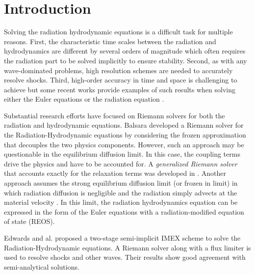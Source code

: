 \documentclass[review]{elsarticle}
\begin{document}
\section{Introduction}
\label{sec:section1}

Solving the radiation hydrodynamic equations is a difficult task for multiple reasons. First, the characteristic time scales between the radiation and hydrodynamics are different by several orders of magnitude which often requires the radiation part to be solved implicitly to ensure stability. Second, as with any wave-dominated problems, high resolution schemes are needed to accurately resolve shocks. Third, high-order accuracy in time and space is challenging to achieve but some recent works provide examples of such results when solving either the Euler equations \cite{Hussaini, jlg1, jlg2, Leveque} or the radiation equation \cite{nse_ragusa_wang,jcp_ragusa_wang}. 

Substantial research efforts have focused on Riemann solvers for both the radiation and hydrodynamic equations. Balsara \cite{Balsara} developed a Riemann solver for the Radiation-Hydrodynamic equations by considering the frozen approximation that decouples the two physics components. However, such an approach may be questionable in the equilibrium diffusion limit. In this case, the coupling terms drive the physics and have to be accounted for. A \emph{generalized Riemann solver} that accounts exactly for the relaxation terms was developed in \cite{LowrieMorelHittinger}. Another approach assumes the strong equilibrium diffusion limit (or frozen in limit) in which radiation diffusion is negligible and the radiation simply advects at the material velocity \cite{Woodward}. In this limit, the radiation hydrodynamics equation can be expressed in the form of the Euler equations with a radiation-modified equation of state (REOS). 

Edwards and al. \cite{EdwardsMorelLowrie} proposed a two-stage semi-implicit IMEX scheme to solve the Radiation-Hydrodynamic equations. A Riemann solver along with a flux limiter is used to resolve shocks and other waves. Their results show good agreement with semi-analytical solutions. 
\end{document}

